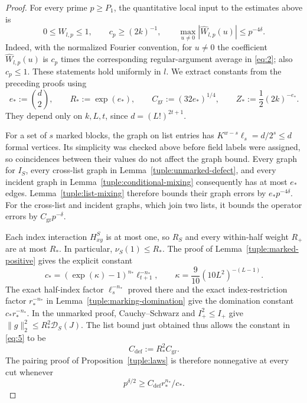 \begin{proof}
For every prime $p\ge P_1$, the quantitative local input to the estimates
above is
\[
 0\le W_{l,p}\le1,\qquad c_p\ge(2k)^{-1},\qquad
 \max_{u\ne0}|\widehat W_{l,p}(u)|\le p^{-4\delta}.
\]
Indeed, with the normalized Fourier convention, for $u\ne0$ the coefficient
$\widehat W_{l,p}(u)$ is $c_p$ times the corresponding regular-argument
average in \eqref{eq:2}; also $c_p\le1$.  These statements hold uniformly
in $l$.  We extract
constants from the preceding proofs using
\[
 e_*:=\binom d2,\qquad R_*:=\exp(e_*),\qquad
 C_{\mathrm{gr}}:=(32e_*)^{1/4},\qquad
 Z_*:=\frac12(2k)^{-e_*}.
\]
They depend only on $k,L,t$, since $d=(L!)^{2t+1}$.

For a set of $s$ marked blocks, the graph on list entries has
$K^{w-s}\ell_s=d/2^s\le d$ formal vertices.  Its simplicity was checked
above before field labels were assigned, so coincidences between their
values do not affect the graph bound.  Every graph for $I_S$, every
cross-list graph in Lemma~\ref{tuple:unmarked-defect}, and every incident
graph in Lemma~\ref{tuple:conditional-mixing} consequently has at most
$e_*$ edges.  Lemma~\ref{tuple:list-mixing} therefore bounds their graph
errors by $e_*p^{-4\delta}$.  For the cross-list and incident graphs,
which join two lists, it bounds the operator errors by
$C_{\mathrm{gr}}p^{-\delta}$.

Each index interaction $H^S_{xy}$ is at most one, so $R_S$ and every
within-half weight $R_+$ are at most $R_*$.  In particular,
$\nu_S(1)\le R_*$.  The proof of Lemma~\ref{tuple:marked-positive} gives
the explicit constant
\[
 c_*=(\exp(\kappa)-1)^{n_*}\ell_{t+1}^{-n_*},
 \qquad
 \kappa=\frac9{10}(10L^2)^{-(L-1)}.
\]
The exact half-index factor $\ell_s^{-n_*}$ proved there and the exact
index-restriction factor $r_*^{-n_*}$ in
Lemma~\ref{tuple:marking-domination} give the domination constant
$c_*r_*^{-n_*}$.  In the unmarked
proof, Cauchy--Schwarz and $I_+^2\le I_+$ give
$\|g\|_2^2\le R_*^2\mathcal D_S(J)$.  The list bound just obtained thus
allows the constant in \eqref{eq:5} to be
\[
 C_{\mathrm{def}}:=R_*^2C_{\mathrm{gr}}.
\]
The pairing proof of Proposition~\ref{tuple:laws} is therefore
nonnegative at every cut whenever
\[
 p^{\delta/2}\ge C_{\mathrm{def}}r_*^{n_*}/c_*.
\]


\end{proof}
